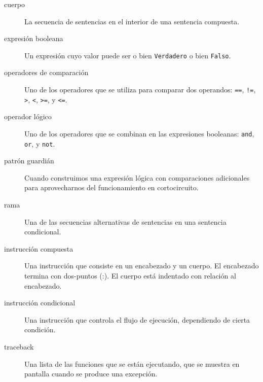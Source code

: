 
\begin{description}
\item[cuerpo]
La secuencia de sentencias en el interior de una sentencia compuesta.
\end{description}


\begin{description}
\item[expresión booleana]
Un expresión cuyo valor puede ser o bien \texttt{Verdadero} o bien
\texttt{Falso}.
\end{description}

 

\begin{description}
\item[operadores de comparación]
Uno de los operadores que se utiliza para comparar dos operandos:
\texttt{==}, \texttt{!=}, \texttt{\textgreater{}}, \texttt{\textless{}},
\texttt{\textgreater{}=}, y \texttt{\textless{}=}.
\item[operador lógico]
Uno de los operadores que se combinan en las expresiones booleanas:
\texttt{and}, \texttt{or}, y \texttt{not}.
\item[patrón guardián]
Cuando construimos una expresión lógica con comparaciones adicionales
para aprovecharnos del funcionamiento en cortocircuito.
\end{description}

 

\begin{description}
\item[rama]
Una de las secuencias alternativas de sentencias en una sentencia
condicional.
\end{description}


\begin{description}
\item[instrucción compuesta]
Una instrucción que consiste en un encabezado y un cuerpo. El encabezado
termina con dos-puntos (:). El cuerpo está indentado con relación al
encabezado.
\end{description}

 

\begin{description}
\item[instrucción condicional]
Una instrucción que controla el flujo de ejecución, dependiendo de
cierta condición.
\end{description}

 

\begin{description}
\item[traceback]
Una lista de las funciones que se están ejecutando, que se muestra en
pantalla cuando se produce una excepción.
\end{description}



